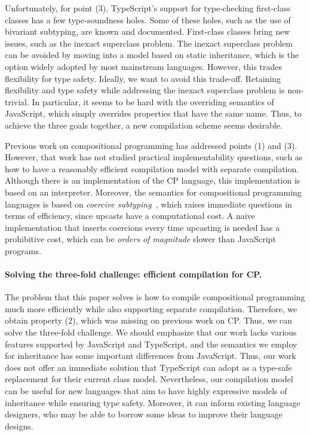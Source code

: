 Unfortunately, for point (3), TypeScript's support for type-checking first-class
classes has a few type-soundness holes. Some of these holes, such as the use of
bivariant subtyping, are known and documented. First-class classes bring new
issues, such as the inexact superclass problem. The inexact superclass problem
can be avoided by moving into a model based on static inheritance, which is the
option widely adopted by most mainstream languages. However, this trades
flexibility for type safety. Ideally, we want to avoid this trade-off. Retaining
flexibility and type safety while addressing the inexact superclass problem is
non-trivial. In particular, it seems to be hard with the overriding semantics of
JavaScript, which simply overrides properties that have the same name. Thus, to
achieve the three goals together, a new compilation scheme seems desirable.

Previous work on compositional programming has addressed points (1) and (3).
However, that work has not studied practical implementability questions, such as
how to have a reasonably efficient compilation model with separate compilation.
Although there is an implementation of the CP language, this implementation is
based on an interpreter. Moreover, the semantics for compositional programming
languages is based on \emph{coercive subtyping}~\citep{luo2013coercive}, which
raises immediate questions in terms of efficiency, since upcasts have a
computational cost. A naive implementation that inserts coercions every time
upcasting is needed has a prohibitive cost, which can be \emph{orders of
magnitude} slower than JavaScript programs.

\paragraph{Solving the three-fold challenge: efficient compilation for CP.}
The problem that this paper solves is how to compile compositional programming
much more efficiently while also supporting separate compilation. Therefore, we
obtain property (2), which was missing on previous work on CP. Thus, we can
solve the three-fold challenge. We should emphasize that our work lacks various
features supported by JavaScript and TypeScript, and the semantics we employ for
inheritance has some important differences from JavaScript. Thus, our work does
not offer an immediate solution that TypeScript can adopt as a type-safe
replacement for their current class model. Nevertheless, our compilation model
can be useful for new languages that aim to have highly expressive models of
inheritance while ensuring type safety. Moreover, it can inform existing
language designers, who may be able to borrow some ideas to improve their
language designs.

